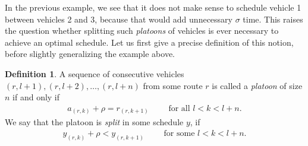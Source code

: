 \documentclass[a4paper]{report}
\theoremstyle{definition}
\newtheorem{define}{Definition}[chapter]
\theoremstyle{plain}
\begin{document}
In the previous example, we see that it does not make sense to schedule vehicle
1 between vehicles 2 and 3, because that would add unnecessary $\sigma$ time. This
raises the question whether splitting such \textit{platoons} of vehicles is ever
necessary to achieve an optimal schedule. Let us first give a precise definition
of this notion, before slightly generalizing the example above.
%
\begin{define}
  A sequence of consecutive vehicles $(r, l+1), (r, l+2), \dots, (r, l+n)$ from
  some route $r$ is called a \textit{platoon} of size $n$ if and only if
  \begin{align*}
  a_{(r,k)} + \rho = r_{(r, k+1)}  \quad \quad \text{ for all } l < k < l + n.
  \end{align*}
 We say that the platoon is \textit{split}
  in some schedule $y$, if
  \begin{align*}
  y_{(r, k)} + \rho < y_{(r, k + 1)} \quad \quad \text{ for some } l < k < l + n.
  \end{align*}
\end{define}
%
\end{document}
